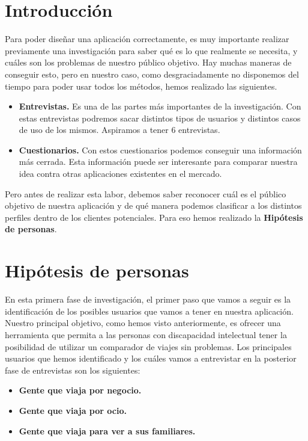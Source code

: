
\section{Introducción}

Para poder diseñar una aplicación correctamente, es muy importante realizar previamente una investigación para saber qué
es lo que realmente se necesita, y cuáles son los problemas de nuestro público objetivo. Hay muchas maneras de conseguir esto, pero en nuestro
caso, como desgraciadamente no disponemos del tiempo para poder usar todos los métodos, hemos realizado las siguientes.

\begin{itemize}
    \item \textbf{Entrevistas.} Es una de las partes más importantes de la investigación. Con estas entrevistas podremos sacar distintos tipos de usuarios y distintos casos de uso de los mismos. Aspiramos a tener 6 entrevistas.
    \item \textbf{Cuestionarios.} Con estos cuestionarios podemos conseguir una información más cerrada. Esta información puede ser interesante para comparar nuestra idea contra otras aplicaciones existentes en el mercado.
\end{itemize}



Pero antes de realizar esta labor, debemos saber reconocer cuál es el público objetivo de nuestra aplicación y
de qué manera podemos clasificar a los distintos perfiles dentro de los clientes potenciales. Para eso hemos realizado la
\textbf{Hipótesis de personas}.

\section{Hipótesis de personas}

En esta primera fase de investigación, el primer paso que vamos a seguir es la identificación de los posibles usuarios que vamos a tener
en nuestra aplicación. Nuestro principal objetivo, como hemos visto anteriormente, es ofrecer una herramienta que permita a las personas con
discapacidad intelectual tener la posibilidad de utilizar un comparador de viajes sin problemas. Los principales usuarios que hemos identificado
y los cuáles vamos a entrevistar en la posterior fase de entrevistas son los siguientes:

\begin{itemize}
    \item\textbf{Gente que viaja por negocio.}
    \item\textbf{Gente que viaja por ocio.}
    \item\textbf{Gente que viaja para ver a sus familiares.}
\end{itemize}

